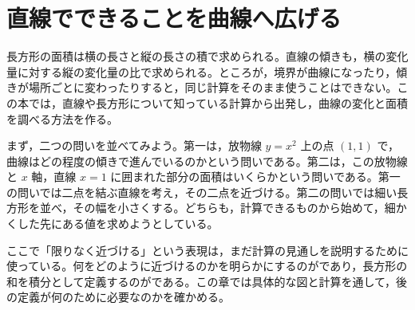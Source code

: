 \section{直線でできることを曲線へ広げる}
長方形の面積は横の長さと縦の長さの積で求められる。直線の傾きも，横の変化量に対する縦の変化量の比で求められる。ところが，境界が曲線になったり，傾きが場所ごとに変わったりすると，同じ計算をそのまま使うことはできない。この本では，直線や長方形について知っている計算から出発し，曲線の変化と面積を調べる方法を作る。

まず，二つの問いを並べてみよう。第一は，放物線 $y=x^2$ 上の点 $(1,1)$ で，曲線はどの程度の傾きで進んでいるのかという問いである。第二は，この放物線と $x$ 軸，直線 $x=1$ に囲まれた部分の面積はいくらかという問いである。第一の問いでは二点を結ぶ直線を考え，その二点を近づける。第二の問いでは細い長方形を並べ，その幅を小さくする。どちらも，計算できるものから始めて，細かくした先にある値を求めようとしている。

ここで「限りなく近づける」という表現は，まだ計算の見通しを説明するために使っている。何をどのように近づけるのかを明らかにするのがであり，長方形の和を積分として定義するのがである。この章では具体的な図と計算を通して，後の定義が何のために必要なのかを確かめる。

